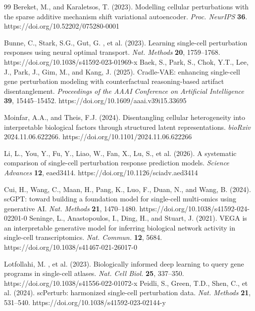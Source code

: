 \documentclass[11pt,a4paper]{article}
\begin{document}
\begin{thebibliography}{99}
 Bereket, M., and Karaletsos, T. (2023). Modelling cellular perturbations with the sparse additive mechanism shift variational autoencoder. \textit{Proc. NeurIPS} \textbf{36}. https://doi.org/10.52202/075280-0001

 Bunne, C., Stark, S.G., Gut, G. , et al. (2023). Learning single-cell perturbation responses using neural optimal transport. \textit{Nat. Methods} \textbf{20}, 1759--1768. https://doi.org/10.1038/s41592-023-01969-x
 Baek, S., Park, S., Chok, Y.T., Lee, J., Park, J., Gim, M., and Kang, J. (2025). Cradle-VAE: enhancing single-cell gene perturbation modeling with counterfactual reasoning-based artifact disentanglement. \textit{Proceedings of the AAAI Conference on Artificial Intelligence} \textbf{39}, 15445--15452. https://doi.org/10.1609/aaai.v39i15.33695

 Moinfar, A.A., and Theis, F.J. (2024). Disentangling cellular heterogeneity into interpretable biological factors through structured latent representations. \textit{bioRxiv} 2024.11.06.622266. https://doi.org/10.1101/2024.11.06.622266

 Li, L., You, Y., Fu, Y., Liao, W., Fan, X., Lu, S., et al. (2026). A systematic comparison of single-cell perturbation response prediction models. \textit{Science Advances} \textbf{12}, eaed3414. https://doi.org/10.1126/sciadv.aed3414

 Cui, H., Wang, C., Maan, H., Pang, K., Luo, F., Duan, N., and Wang, B. (2024). scGPT: toward building a foundation model for single-cell multi-omics using generative AI. \textit{Nat. Methods} \textbf{21}, 1470--1480. https://doi.org/10.1038/s41592-024-02201-0
 Seninge, L., Anastopoulos, I., Ding, H., and Stuart, J. (2021). VEGA is an interpretable generative model for inferring biological network activity in single-cell transcriptomics. \textit{Nat. Commun.} \textbf{12}, 5684. https://doi.org/10.1038/s41467-021-26017-0

 Lotfollahi, M. , et al. (2023). Biologically informed deep learning to query gene programs in single-cell atlases. \textit{Nat. Cell Biol.} \textbf{25}, 337--350. https://doi.org/10.1038/s41556-022-01072-x
 Peidli, S., Green, T.D., Shen, C., et al. (2024). scPerturb: harmonized single-cell perturbation data. \textit{Nat. Methods} \textbf{21}, 531--540. https://doi.org/10.1038/s41592-023-02144-y


\end{thebibliography}
\end{document}

